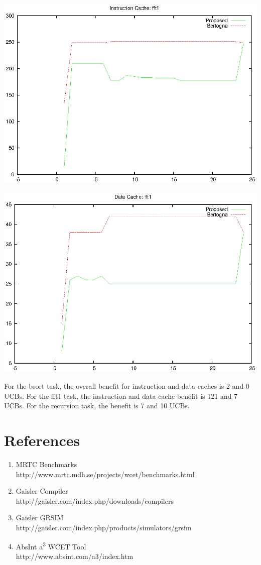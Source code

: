 \documentclass[12pt]{article}
\begin{document}
\includegraphics{eps/fft1-icache.eps}

\includegraphics{eps/fft1-dcache.eps}

For the bsort task, the overall benefit for instruction and data
caches is 2 and 0 UCBs. For the fft1 task, the instruction and data
cache benefit is 121 and 7 UCBs. For the recursion task, the benefit
is 7 and 10 UCBs.

\section{References}

\begin{enumerate}
\item MRTC Benchmarks \\
http://www.mrtc.mdh.se/projects/wcet/benchmarks.html

\item Gaisler Compiler  \\
http://gaisler.com/index.php/downloads/compilers

\item Gaisler GRSIM \\
http://gaisler.com/index.php/products/simulators/grsim

\item AbsInt a\textsuperscript{3} WCET Tool \\
http://www.absint.com/a3/index.htm
\end{enumerate}
\end{document}
